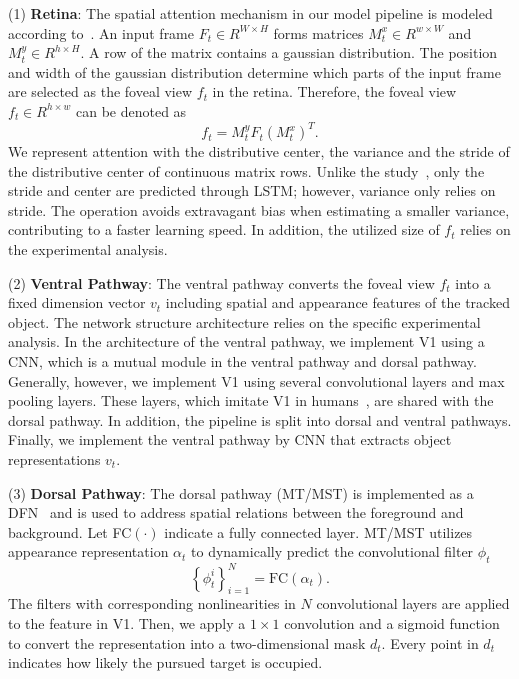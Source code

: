 \documentclass[journal]{IEEEtran}
\begin{document}
(1) \textbf{Retina}: 
The spatial attention mechanism in our model pipeline is modeled according to~\cite{RATM}. 
An input frame $F_t \in R^{W \times H}$ forms matrices $M_t^x \in R^{w \times W}$ and $M_t^y \in R^{h \times H}$.
A row of the matrix contains a gaussian distribution. 
The position and width of the gaussian distribution determine which parts of the input frame are selected as the foveal view $f_t$ in the retina.
Therefore, the foveal view $f_t \in R^{h \times w}$ can be denoted as
\begin{equation}
	f_t = M_t^y F_t (M_t^x)^T.
\end{equation}
We represent attention with the distributive center, the variance and the stride of the distributive center of continuous matrix rows.
Unlike the study~\cite{hart}, only the stride and center are predicted through LSTM;
however, variance only relies on stride.
The operation avoids extravagant bias when estimating a smaller variance, contributing to a faster learning speed. 
In addition, the utilized size of $f_t$ relies on the experimental analysis. 

(2) \textbf{Ventral Pathway}: 
The ventral pathway converts the foveal view $f_t$ into a fixed dimension vector $v_t$ including spatial and appearance features of the tracked object. 
The network structure architecture relies on the specific experimental analysis. 
In the architecture of the ventral pathway, we implement V1 using a CNN, which is a mutual module in the ventral pathway and dorsal pathway.
Generally, however, we implement V1 using several convolutional layers and max pooling layers. 
These layers, which imitate V1 in humans~\cite{theoretical_neuroscience}, are shared with the dorsal pathway.
In addition, the pipeline is split into dorsal and ventral pathways. 
Finally, we implement the ventral pathway by CNN that extracts object representations $v_t$.

(3) \textbf{Dorsal Pathway}: 
The dorsal pathway (MT/MST) is implemented as a DFN~\cite{brabandere2016dynamic} 
and is used to address spatial relations between the foreground and background. 
Let FC$(\cdot)$ indicate a fully connected layer.
MT/MST utilizes appearance representation $\alpha_t$ to dynamically predict the convolutional filter $\phi_t$
\begin{equation}
	\left\{ \phi _t ^i \right\}_{i=1}^N = \text{FC}(\alpha_t).
\end{equation}
The filters with corresponding nonlinearities in $N$ convolutional layers are applied to the feature in V1. 
Then, we apply a $1 \times 1$ convolution and a sigmoid function to convert the representation into a two-dimensional mask $d_t$.
Every point in $d_t$ indicates how likely the pursued target is occupied.
\end{document}
